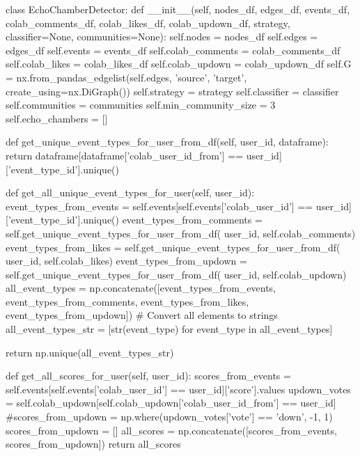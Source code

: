 \begin{codigo}[caption={Exemplo de classe Python para deteção de câmaras de eco}, label={codigo:echochamberdetector}, language=Python, breaklines=true]
    class EchoChamberDetector:
    def __init__(self, nodes_df, edges_df, events_df, colab_comments_df, colab_likes_df, colab_updown_df, strategy, classifier=None, communities=None):
        self.nodes = nodes_df
        self.edges = edges_df
        self.events = events_df
        self.colab_comments = colab_comments_df
        self.colab_likes = colab_likes_df
        self.colab_updown = colab_updown_df
        self.G = nx.from_pandas_edgelist(self.edges, 'source', 'target', create_using=nx.DiGraph())
        self.strategy = strategy
        self.classifier = classifier
        self.communities = communities
        self.min_community_size = 3
        self.echo_chambers = []

    def get_unique_event_types_for_user_from_df(self, user_id, dataframe):
        return dataframe[dataframe['colab_user_id_from'] == user_id]['event_type_id'].unique()

    def get_all_unique_event_types_for_user(self, user_id):
        event_types_from_events = self.events[self.events['colab_user_id']
                                              == user_id]['event_type_id'].unique()
        event_types_from_comments = self.get_unique_event_types_for_user_from_df(
            user_id, self.colab_comments)
        event_types_from_likes = self.get_unique_event_types_for_user_from_df(
            user_id, self.colab_likes)
        event_types_from_updown = self.get_unique_event_types_for_user_from_df(
            user_id, self.colab_updown)
        all_event_types = np.concatenate([event_types_from_events, event_types_from_comments,
                                          event_types_from_likes, event_types_from_updown])
        # Convert all elements to strings
        all_event_types_str = [str(event_type) for event_type in all_event_types]

        return np.unique(all_event_types_str)

    def get_all_scores_for_user(self, user_id):
        scores_from_events = self.events[self.events['colab_user_id']
                                         == user_id]['score'].values
        updown_votes = self.colab_updown[self.colab_updown['colab_user_id_from'] == user_id]
        #scores_from_updown = np.where(updown_votes['vote'] == 'down', -1, 1)
        scores_from_updown = []
        all_scores = np.concatenate([scores_from_events, scores_from_updown])
        return all_scores


\end{codigo}
